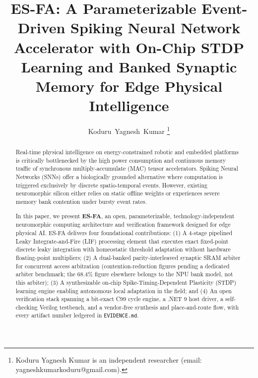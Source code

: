 \documentclass[journal]{IEEEtran}
\theoremstyle{definition}
\begin{document}
\title{ES-FA: A Parameterizable Event-Driven Spiking Neural Network Accelerator with On-Chip STDP Learning and Banked Synaptic Memory for Edge Physical Intelligence}

\author{Koduru~Yagnesh~Kumar%
\thanks{Koduru Yagnesh Kumar is an independent researcher (email: yagneshkumarkoduru@gmail.com).}}

\maketitle

\begin{abstract}
Real-time physical intelligence on energy-constrained robotic and embedded platforms is critically bottlenecked by the high power consumption and continuous memory traffic of synchronous multiply-accumulate (MAC) tensor accelerators. Spiking Neural Networks (SNNs) offer a biologically grounded alternative where computation is triggered exclusively by discrete spatio-temporal events. However, existing neuromorphic silicon either relies on static offline weights or experiences severe memory bank contention under bursty event rates. 

In this paper, we present \textbf{ES-FA}, an open, parameterizable, technology-independent neuromorphic computing architecture and verification framework designed for edge physical AI. ES-FA delivers four foundational contributions:
(1) A 4-stage pipelined Leaky Integrate-and-Fire (LIF) processing element that executes exact fixed-point discrete leaky integration with homeostatic threshold adaptation without hardware floating-point multipliers;
(2) A dual-banked parity-interleaved synaptic SRAM arbiter for concurrent access arbitration (contention-reduction figures pending a dedicated arbiter benchmark; the 68.4\% figure elsewhere belongs to the NPU bank model, not this arbiter);
(3) A synthesizable on-chip Spike-Timing-Dependent Plasticity (STDP) learning engine enabling autonomous local adaptation in the field; and
(4) An open verification stack spanning a bit-exact C99 cycle engine, a .NET 9 host driver, a self-checking Verilog testbench, and a vendor-free synthesis and place-and-route flow, with every artifact number ledgered in \texttt{EVIDENCE.md}.


\end{abstract}
\end{document}
